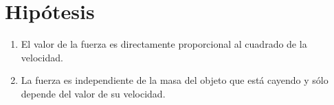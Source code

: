 \section{Hipótesis}

\begin{enumerate}
    \item El valor de la fuerza es directamente proporcional al cuadrado
        de la velocidad.
    \item La fuerza es independiente de la masa del objeto que está
        cayendo y sólo depende del valor de su velocidad.
\end{enumerate}
